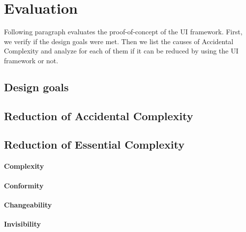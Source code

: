 \section{Evaluation}\label{evaluation}

Following paragraph evaluates the proof-of-concept of the UI framework. First, we verify if the design goals were met. Then we list the causes of Accidental Complexity and analyze for each of them if it can be reduced by using the UI framework or not.

\subsection{Design goals}\label{designgoals}

\subsection{Reduction of Accidental Complexity}\label{accidentalcomplexity}
\subsection{Reduction of Essential Complexity}\label{essentialcomplexity}
\paragraph{Complexity}
\paragraph{Conformity}
\paragraph{Changeability}
\paragraph{Invisibility}
